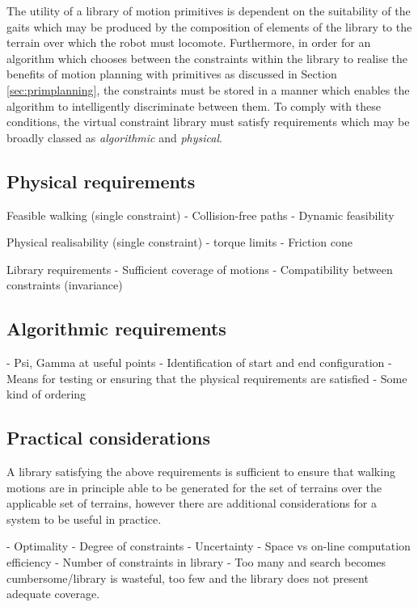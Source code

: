 The utility of a library of motion primitives is dependent on the suitability of the gaits which may be produced by the composition of elements of the library to the terrain over which the robot must locomote. Furthermore, in order for an algorithm which chooses between the constraints within the library to realise the benefits of motion planning with primitives as discussed in Section \ref{sec:primplanning}, the constraints must be stored in a manner which enables the algorithm to intelligently discriminate between them. To comply with these conditions, the virtual constraint library must satisfy requirements which may be broadly classed as \textit{algorithmic} and \textit{physical}.

\subsection{Physical requirements}
Feasible walking (single constraint)
- Collision-free paths
- Dynamic feasibility

Physical realisability (single constraint)
- torque limits
- Friction cone

Library requirements
- Sufficient coverage of motions
- Compatibility between constraints (invariance)

\subsection{Algorithmic requirements}
- Psi, Gamma at useful points
- Identification of start and end configuration
- Means for testing or ensuring that the physical requirements are satisfied
- Some kind of ordering

\subsection{Practical considerations}
A library satisfying the above requirements is sufficient to ensure that walking motions are in principle able to be generated for the set of terrains over the applicable set of terrains, however there are additional considerations for a system to be useful in practice.

- Optimality
- Degree of constraints
- Uncertainty
- Space vs on-line computation efficiency
- Number of constraints in library - Too many and search becomes cumbersome/library is wasteful, too few and the library does not present adequate coverage.